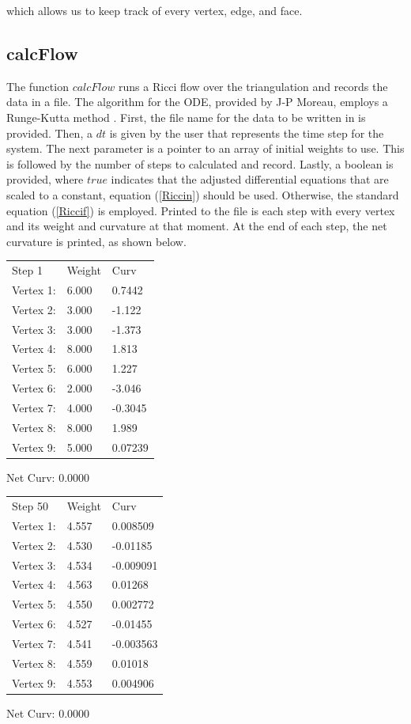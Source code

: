 \documentclass[12pt]{article}
\begin{document}
\noindent which allows us to keep track of every vertex, edge, and face.

\subsection{calcFlow}

\noindent The function $calcFlow$ runs a Ricci flow over the triangulation and records the data in a file. The algorithm for the ODE, provided by J-P Moreau, employs a Runge-Kutta method \cite{JPM}. First, the file name for the data to be written in is provided. Then, a $dt$ is given by the user that represents the time step for the system. The next parameter is a pointer to an array of initial weights to use. This is followed by the number of steps to calculated and record. Lastly, a boolean is provided, where $true$ indicates that the adjusted differential equations that are scaled to a constant, equation (\ref{Riccin}) should be used. Otherwise, the standard equation (\ref{Riccif}) is employed. Printed to the file is each step with every vertex and its weight and curvature at that moment. At the end of each step, the net curvature is printed, as shown below. \newline 
\begin{multicols}{2}
\begin{tabular}{l|l|l}
\hline
Step 1   & Weight &  Curv\\
Vertex 1:& 6.000 & 0.7442\\
Vertex 2: &3.000 & -1.122\\
Vertex 3:& 3.000 & -1.373\\
Vertex 4:& 8.000 & 1.813\\
Vertex 5: &6.000 & 1.227\\
Vertex 6: &2.000 & -3.046\\
Vertex 7: &4.000 & -0.3045\\
Vertex 8: &8.000 & 1.989\\
Vertex 9: &5.000 & 0.07239\\ \hline
\end{tabular} Net Curv: 0.0000 

\begin{tabular}{l|l|l}
\hline
Step 50 &  Weight &  Curv\\
Vertex 1:& 4.557 & 0.008509\\
Vertex 2: &4.530 & -0.01185\\
Vertex 3: &4.534 & -0.009091\\
Vertex 4:& 4.563 & 0.01268\\
Vertex 5:& 4.550 & 0.002772\\
Vertex 6: &4.527 & -0.01455\\
Vertex 7: &4.541 & -0.003563\\
Vertex 8: &4.559 & 0.01018\\
Vertex 9: &4.553 & 0.004906\\ \hline
\end{tabular}
Net Curv: 0.0000
\end{multicols}
\end{document}
